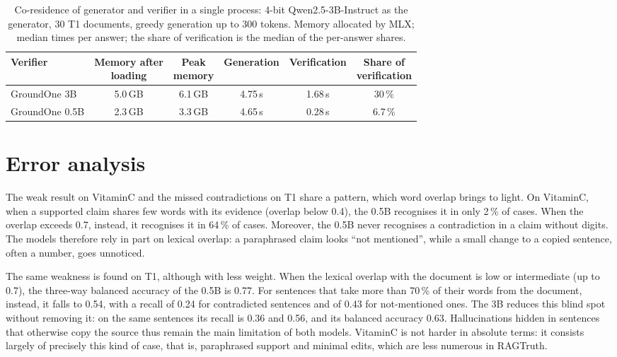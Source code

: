 \begin{table}[htbp]
\centering
\caption{Co-residence of generator and verifier in a single process: 4-bit Qwen2.5-3B-Instruct as the generator, 30 T1
documents, greedy generation up to 300 tokens. Memory allocated by MLX; median times per answer; the share of
verification is the median of the per-answer shares.}
\label{tab:results-coresidence}
\small
\begin{tabular}{lccccc}
\toprule
Verifier & \makecell{Memory after\\loading} & \makecell{Peak\\memory} & Generation & Verification & \makecell{Share of\\verification} \\
\midrule
GroundOne 3B & 5.0\,GB & 6.1\,GB & 4.75\,s & 1.68\,s & 30\,\% \\
GroundOne 0.5B & 2.3\,GB & 3.3\,GB & 4.65\,s & 0.28\,s & 6.7\,\% \\
\bottomrule
\end{tabular}
\end{table}

\section{Error analysis}
\label{sec:results-errors}

The weak result on VitaminC and the missed contradictions on T1 share a pattern, which word overlap brings to light.
On VitaminC, when a supported claim shares few words with its evidence (overlap below 0.4), the 0.5B recognises it in
only 2\,\% of cases. When the overlap exceeds 0.7, instead, it recognises it in 64\,\% of cases. Moreover, the 0.5B
never recognises a contradiction in a claim without digits. The models therefore rely in part on lexical overlap: a
paraphrased claim looks ``not mentioned'', while a small change to a copied sentence, often a number, goes unnoticed.

The same weakness is found on T1, although with less weight. When the lexical overlap with the document is low or
intermediate (up to 0.7), the three-way balanced accuracy of the 0.5B is 0.77. For sentences that take more than 70\,\%
of their words from the document, instead, it falls to 0.54, with a recall of 0.24 for contradicted sentences and of
0.43 for not-mentioned ones. The 3B reduces this blind spot without removing it: on the same sentences its recall is
0.36 and 0.56, and its balanced accuracy 0.63. Hallucinations hidden in sentences that otherwise copy the source thus
remain the main limitation of both models. VitaminC is not harder in absolute terms: it consists largely of precisely
this kind of case, that is, paraphrased support and minimal edits, which are less numerous in RAGTruth.

